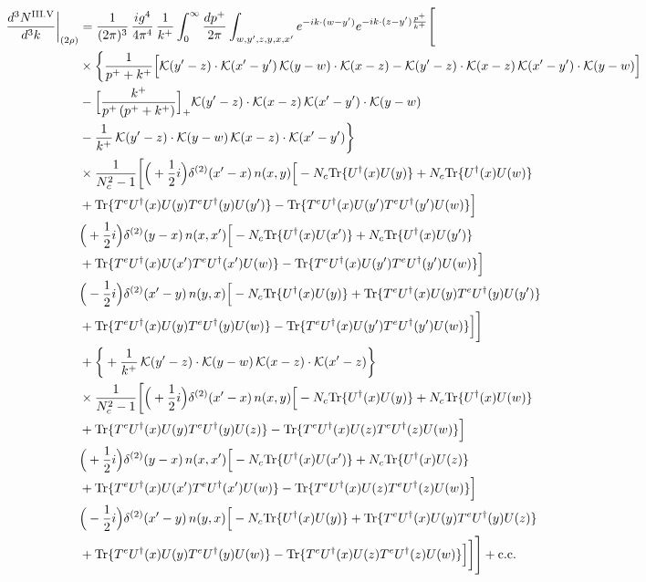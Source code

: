 \documentclass[9pt]{article}
\numberwithin{equation}{section}
\begin{document}
\begin{align}
\frac{d^{3}N^{\rm III.V}}{d^{3}k}\bigg|_{(2\rho)}&=\frac{1}{(2\pi)^{3}}\,\frac{ig^{4}}{4\pi^{4}}\,\frac{1}{k^{+}}\int_{0}^{\infty}\frac{dp^{+}}{2\pi}\int_{w,y',z,y,x,x'}e^{-ik\cdot(w-y')}e^{-ik\cdot(z-y')\frac{p^{+}}{k^{+}}}\Bigg[\notag\\
&\times\bigg\{\frac{1}{p^{+}+k^{+}}\Big[\mathcal{K}(y'-z)\cdot\mathcal{K}(x'-y')\,\mathcal{K}(y-w)\cdot\mathcal{K}(x-z)-\mathcal{K}(y'-z)\cdot\mathcal{K}(x-z)\,\mathcal{K}(x'-y')\cdot\mathcal{K}(y-w)\Big]\notag\\
&-\Big[\frac{k^{+}}{p^{+}\,(p^{+}+k^{+})}\Big]_{+}\mathcal{K}(y'-z)\cdot\mathcal{K}(x-z)\,\mathcal{K}(x'-y')\cdot\mathcal{K}(y-w)\notag\\
&-\frac{1}{k^{+}}\,\mathcal{K}(y'-z)\cdot\mathcal{K}(y-w)\,\mathcal{K}(x-z)\cdot\mathcal{K}(x'-y')\bigg\}\notag\\
&\times \frac{1}{N_{c}^{2}-1}\bigg[\Big(+\frac{1}{2}i\Big)\delta^{(2)}(x'-x)\,n(x,y)\Big[-N_{c}{\rm Tr}\{U^{\dagger}(x)U(y)\}+N_{c}{\rm Tr}\{U^{\dagger}(x)U(w)\}\notag\\
& +{\rm Tr}\{T^{e}U^{\dagger}(x)U(y)T^{e}U^{\dagger}(y)U(y')\}-{\rm Tr}\{T^{e}U^{\dagger}(x)U(y')T^{e}U^{\dagger}(y')U(w)\}\Big]\notag\\
& \Big(+\frac{1}{2}i\Big)\delta^{(2)}(y-x)\,n(x,x')\Big[-N_{c}{\rm Tr}\{U^{\dagger}(x)U(x')\}+N_{c}{\rm Tr}\{U^{\dagger}(x)U(y')\}\notag\\
& +{\rm Tr}\{T^{e}U^{\dagger}(x)U(x')T^{e}U^{\dagger}(x')U(w)\}-{\rm Tr}\{T^{e}U^{\dagger}(x)U(y')T^{e}U^{\dagger}(y')U(w)\}\Big]\notag\\
& \Big(-\frac{1}{2}i\Big)\delta^{(2)}(x'-y)\,n(y,x)\Big[-N_{c}{\rm Tr}\{U^{\dagger}(x)U(y)\}+{\rm Tr}\{T^{e}U^{\dagger}(x)U(y)T^{e}U^{\dagger}(y)U(y')\}\notag\\
& +{\rm Tr}\{T^{e}U^{\dagger}(x)U(y)T^{e}U^{\dagger}(y)U(w)\}-{\rm Tr}\{T^{e}U^{\dagger}(x)U(y')T^{e}U^{\dagger}(y')U(w)\}\Big]\bigg]\notag\\
&+\bigg\{+\frac{1}{k^{+}}\,\mathcal{K}(y'-z)\cdot\mathcal{K}(y-w)\,\mathcal{K}(x-z)\cdot\mathcal{K}(x'-z)\bigg\}\notag\\
&\times \frac{1}{N_{c}^{2}-1}\bigg[\Big(+\frac{1}{2}i\Big)\delta^{(2)}(x'-x)\,n(x,y)\Big[-N_{c}{\rm Tr}\{U^{\dagger}(x)U(y)\}+N_{c}{\rm Tr}\{U^{\dagger}(x)U(w)\}\notag\\
& +{\rm Tr}\{T^{e}U^{\dagger}(x)U(y)T^{e}U^{\dagger}(y)U(z)\}-{\rm Tr}\{T^{e}U^{\dagger}(x)U(z)T^{e}U^{\dagger}(z)U(w)\}\Big]\notag\\
& \Big(+\frac{1}{2}i\Big)\delta^{(2)}(y-x)\,n(x,x')\Big[-N_{c}{\rm Tr}\{U^{\dagger}(x)U(x')\}+N_{c}{\rm Tr}\{U^{\dagger}(x)U(z)\}\notag\\
& +{\rm Tr}\{T^{e}U^{\dagger}(x)U(x')T^{e}U^{\dagger}(x')U(w)\}-{\rm Tr}\{T^{e}U^{\dagger}(x)U(z)T^{e}U^{\dagger}(z)U(w)\}\Big]\notag\\
& \Big(-\frac{1}{2}i\Big)\delta^{(2)}(x'-y)\,n(y,x)\Big[-N_{c}{\rm Tr}\{U^{\dagger}(x)U(y)\}+{\rm Tr}\{T^{e}U^{\dagger}(x)U(y)T^{e}U^{\dagger}(y)U(z)\}\notag\\
& +{\rm Tr}\{T^{e}U^{\dagger}(x)U(y)T^{e}U^{\dagger}(y)U(w)\}-{\rm Tr}\{T^{e}U^{\dagger}(x)U(z)T^{e}U^{\dagger}(z)U(w)\}\Big]\bigg]\Bigg]+{\rm c.c.}\label{eq:E-III.V-2}
\end{align}
\end{document}
